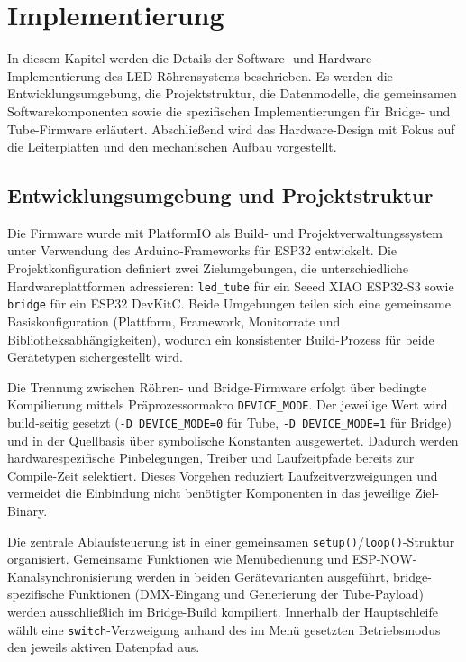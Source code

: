 \chapter{Implementierung}
\label{chap:implementierung}

In diesem Kapitel werden die Details der Software- und Hardware-Implementierung 
des LED-Röhrensystems beschrieben. Es werden die Entwicklungsumgebung, 
die Projektstruktur, die Datenmodelle, die gemeinsamen Softwarekomponenten 
sowie die spezifischen Implementierungen für Bridge- und Tube-Firmware erläutert. 
Abschließend wird das Hardware-Design mit Fokus auf die Leiterplatten 
und den mechanischen Aufbau vorgestellt.

\section{Entwicklungsumgebung und Projektstruktur}
\label{sec:entwicklungsumgebung}

Die Firmware wurde mit PlatformIO als Build- und
Projektverwaltungssystem unter Verwendung des Arduino-Frameworks für
ESP32 entwickelt. Die Projektkonfiguration definiert zwei
Zielumgebungen, die unterschiedliche Hardwareplattformen adressieren:
\texttt{led\_tube} für ein Seeed XIAO ESP32-S3 sowie \texttt{bridge}
für ein ESP32 DevKitC. Beide Umgebungen teilen sich eine gemeinsame
Basiskonfiguration (Plattform, Framework, Monitorrate und
Bibliotheksabhängigkeiten), wodurch ein konsistenter Build-Prozess für
beide Gerätetypen sichergestellt wird.

Die Trennung zwischen Röhren- und Bridge-Firmware erfolgt über
bedingte Kompilierung mittels Präprozessormakro \texttt{DEVICE\_MODE}.
Der jeweilige Wert wird build-seitig gesetzt
(\texttt{-D DEVICE\_MODE=0} für Tube, \texttt{-D DEVICE\_MODE=1} für
Bridge) und in der Quellbasis über symbolische Konstanten ausgewertet.
Dadurch werden hardwarespezifische Pinbelegungen, Treiber und
Laufzeitpfade bereits zur Compile-Zeit selektiert. Dieses Vorgehen
reduziert Laufzeitverzweigungen und vermeidet die Einbindung nicht
benötigter Komponenten in das jeweilige Ziel-Binary.

Die zentrale Ablaufsteuerung ist in einer gemeinsamen
\texttt{setup()}/\texttt{loop()}-Struktur organisiert. Gemeinsame
Funktionen wie Menübedienung und ESP-NOW-Kanalsynchronisierung werden
in beiden Gerätevarianten ausgeführt, bridge-spezifische Funktionen
(DMX-Eingang und Generierung der Tube-Payload) werden ausschließlich
im Bridge-Build kompiliert. Innerhalb der Hauptschleife wählt eine
\texttt{switch}-Verzweigung anhand des im Menü gesetzten Betriebsmodus
den jeweils aktiven Datenpfad aus.

